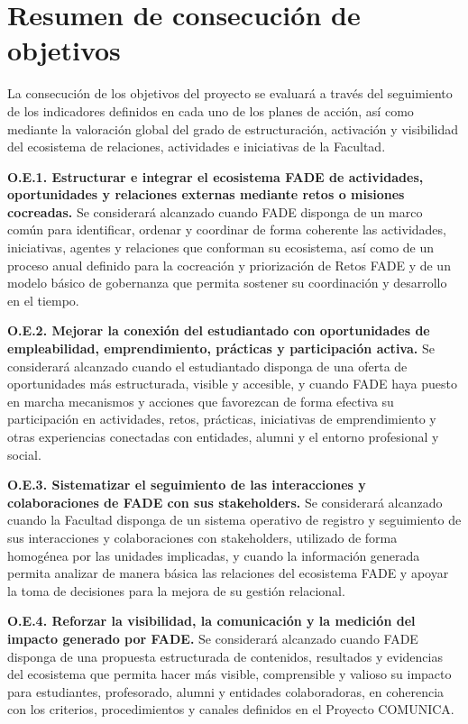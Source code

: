 \documentclass[11pt,a4paper]{scrreprt}
\begin{document}
\section{Resumen de consecución de objetivos}

\small
La consecución de los objetivos del proyecto se evaluará a través del seguimiento de los indicadores definidos en cada uno de los planes de acción, así como mediante la valoración global del grado de estructuración, activación y visibilidad del ecosistema de relaciones, actividades e iniciativas de la Facultad.

\textbf{O.E.1. Estructurar e integrar el ecosistema FADE de actividades, oportunidades y relaciones externas mediante retos o misiones cocreadas.} Se considerará alcanzado cuando FADE disponga de un marco común para identificar, ordenar y coordinar de forma coherente las actividades, iniciativas, agentes y relaciones que conforman su ecosistema, así como de un proceso anual definido para la cocreación y priorización de Retos FADE y de un modelo básico de gobernanza que permita sostener su coordinación y desarrollo en el tiempo.

\textbf{O.E.2. Mejorar la conexión del estudiantado con oportunidades de empleabilidad, emprendimiento, prácticas y participación activa.} Se considerará alcanzado cuando el estudiantado disponga de una oferta de oportunidades más estructurada, visible y accesible, y cuando FADE haya puesto en marcha mecanismos y acciones que favorezcan de forma efectiva su participación en actividades, retos, prácticas, iniciativas de emprendimiento y otras experiencias conectadas con entidades, alumni y el entorno profesional y social.

\textbf{O.E.3. Sistematizar el seguimiento de las interacciones y colaboraciones de FADE con sus stakeholders.} Se considerará alcanzado cuando la Facultad disponga de un sistema operativo de registro y seguimiento de sus interacciones y colaboraciones con stakeholders, utilizado de forma homogénea por las unidades implicadas, y cuando la información generada permita analizar de manera básica las relaciones del ecosistema FADE y apoyar la toma de decisiones para la mejora de su gestión relacional.

\textbf{O.E.4. Reforzar la visibilidad, la comunicación y la medición del impacto generado por FADE.} Se considerará alcanzado cuando FADE disponga de una propuesta estructurada de contenidos, resultados y evidencias del ecosistema que permita hacer más visible, comprensible y valioso su impacto para estudiantes, profesorado, alumni y entidades colaboradoras, en coherencia con los criterios, procedimientos y canales definidos en el Proyecto COMUNICA.
\end{document}
